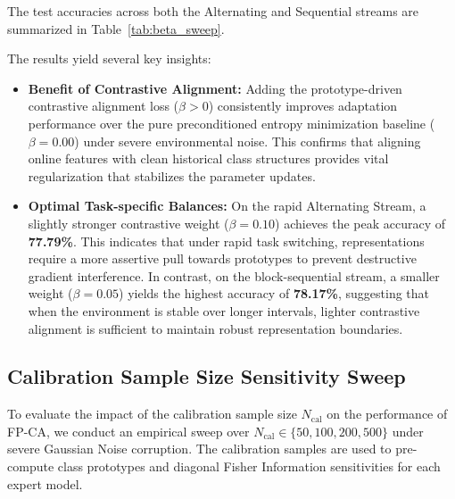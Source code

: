 \documentclass{article}
\theoremstyle{plain}
\theoremstyle{definition}
\theoremstyle{remark}
\begin{document}
The test accuracies across both the Alternating and Sequential streams are summarized in Table~\ref{tab:beta_sweep}.

\begin{table}[h]
\centering
\caption{Sensitivity Analysis of Contrastive Loss Weight $\beta$ (under Gaussian Noise)}
\label{tab:beta_sweep}
\vskip 0.1in
\begin{small}
\end{small}
\end{table}

The results yield several key insights:
\begin{itemize}
  \item \textbf{Benefit of Contrastive Alignment:} Adding the prototype-driven contrastive alignment loss ($\beta > 0$) consistently improves adaptation performance over the pure preconditioned entropy minimization baseline ($\beta = 0.00$) under severe environmental noise. This confirms that aligning online features with clean historical class structures provides vital regularization that stabilizes the parameter updates.
  \item \textbf{Optimal Task-specific Balances:} On the rapid Alternating Stream, a slightly stronger contrastive weight ($\beta = 0.10$) achieves the peak accuracy of \textbf{77.79\%}. This indicates that under rapid task switching, representations require a more assertive pull towards prototypes to prevent destructive gradient interference. In contrast, on the block-sequential stream, a smaller weight ($\beta = 0.05$) yields the highest accuracy of \textbf{78.17\%}, suggesting that when the environment is stable over longer intervals, lighter contrastive alignment is sufficient to maintain robust representation boundaries.
\end{itemize}

\subsection{Calibration Sample Size Sensitivity Sweep}
To evaluate the impact of the calibration sample size $N_{\text{cal}}$ on the performance of FP-CA, we conduct an empirical sweep over $N_{\text{cal}} \in \{50, 100, 200, 500\}$ under severe Gaussian Noise corruption. The calibration samples are used to pre-compute class prototypes and diagonal Fisher Information sensitivities for each expert model.
\end{document}
